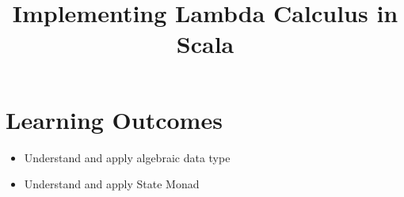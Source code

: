 \documentclass[10pt]{article}
\title{%
  Implementing Lambda Calculus in Scala }
\begin{document}
\maketitle \makeatactive
\thispagestyle{fancy}

\lstset{language=Python}



\section{Learning Outcomes} \label{sec:aims}
\begin{itemize}
 \item Understand and apply algebraic data type
 \item Understand and apply State Monad
\end{itemize}
\end{document}
